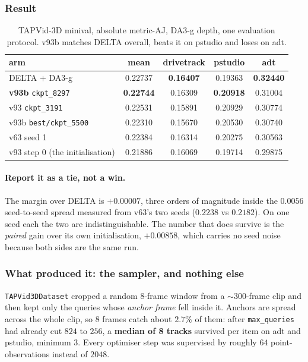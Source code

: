 \documentclass[11pt,a4paper]{article}
\begin{document}
\subsubsection{Result}
\begin{table}[h]
\centering
\caption{TAPVid-3D minival, absolute metric-AJ, DA3-g depth, one evaluation protocol. v93b matches
DELTA overall, beats it on pstudio and loses on adt.}
\label{tab:v93-result}
\begin{tabular}{lcccc}
\toprule
arm & mean & drivetrack & pstudio & adt \\
\midrule
DELTA $+$ DA3-g              & 0.22737 & \textbf{0.16407} & 0.19363 & \textbf{0.32440} \\
\textbf{v93b} \texttt{ckpt\_8297} & \textbf{0.22744} & 0.16309 & \textbf{0.20918} & 0.31004 \\
v93 \texttt{ckpt\_3191}      & 0.22531 & 0.15891 & 0.20929 & 0.30774 \\
v93b \texttt{best/ckpt\_5500}& 0.22310 & 0.15670 & 0.20530 & 0.30740 \\
v63 seed 1                   & 0.22384 & 0.16314 & 0.20275 & 0.30563 \\
v93 step 0 (the initialisation) & 0.21886 & 0.16069 & 0.19714 & 0.29875 \\
\bottomrule
\end{tabular}
\end{table}

\paragraph{Report it as a tie, not a win.} The margin over DELTA is $+0.00007$, three orders of
magnitude inside the $0.0056$ seed-to-seed spread measured from v63's two seeds ($0.2238$ vs
$0.2182$). On one seed each the two are indistinguishable. The number that does survive is the
\emph{paired} gain over its own initialisation, $+0.00858$, which carries no seed noise because
both sides are the same run.

\subsubsection{What produced it: the sampler, and nothing else}
\label{sec:v93-sampler}
\texttt{TAPVid3DDataset} cropped a random $8$-frame window from a $\sim$300-frame clip and then
kept only the queries whose \emph{anchor frame} fell inside it. Anchors are spread across the
whole clip, so $8$ frames catch about $2.7\%$ of them: after \texttt{max\_queries} had already cut
$824$ to $256$, a \textbf{median of 8 tracks} survived per item on adt and pstudio, minimum 3.
Every optimiser step was supervised by roughly $64$ point-observations instead of $2048$.
\end{document}
